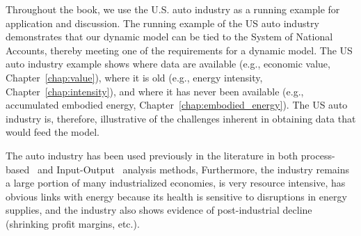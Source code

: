 Throughout the book, we use the U.S. auto industry 
as a running example for application and discussion.
%
%
%
The running example of the US auto industry demonstrates that our dynamic model 
can be tied to the System of National Accounts, 
thereby meeting one of the requirements for a dynamic model. 
%
The US auto industry example shows where data are available 
(e.g., economic value, Chapter~\ref{chap:value}), 
where it is old (e.g., energy intensity, Chapter~\ref{chap:intensity}), 
and where it has never been available 
(e.g., accumulated embodied energy, Chapter~\ref{chap:embodied_energy}).  
The US auto industry is, therefore, 
illustrative of the challenges inherent in obtaining data that would feed the model.
%
%
%
%
%
%

The auto industry has been used previously
in the literature in both 
process-based~\cite{Berry:1973vo, Sullivan1995, Stodolsky1995, 
							Sullivan1998, McCleese2002, Sullivan2010, Hawkins2012}
and Input-Output~\cite{Bullard:1978vd, MacLean1998, MacLean2003}
analysis methods,
Furthermore, the industry
remains a large portion of many industrialized economies, 
is very resource intensive, 
has obvious links with energy because
its health is sensitive to disruptions in energy supplies, and
the industry also shows evidence of 
post-industrial decline (shrinking profit margins, etc.).







